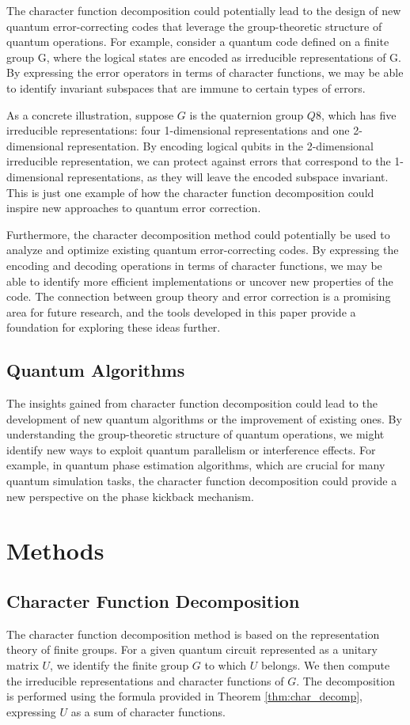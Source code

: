 \documentclass[11pt,a4paper]{article}
\begin{document}
The character function decomposition could potentially lead to the design of new quantum error-correcting codes that leverage the group-theoretic structure of quantum operations. For example, consider a quantum code defined on a finite group G, where the logical states are encoded as irreducible representations of G. By expressing the error operators in terms of character functions, we may be able to identify invariant subspaces that are immune to certain types of errors.

As a concrete illustration, suppose $G$ is the quaternion group $Q8$, which has five irreducible representations: four 1-dimensional representations and one 2-dimensional representation. By encoding logical qubits in the 2-dimensional irreducible representation, we can protect against errors that correspond to the 1-dimensional representations, as they will leave the encoded subspace invariant. This is just one example of how the character function decomposition could inspire new approaches to quantum error correction.

Furthermore, the character decomposition method could potentially be used to analyze and optimize existing quantum error-correcting codes. By expressing the encoding and decoding operations in terms of character functions, we may be able to identify more efficient implementations or uncover new properties of the code. The connection between group theory and error correction is a promising area for future research, and the tools developed in this paper provide a foundation for exploring these ideas further.

\subsection{Quantum Algorithms}
The insights gained from character function decomposition could lead to the development of new quantum algorithms or the improvement of existing ones. By understanding the group-theoretic structure of quantum operations, we might identify new ways to exploit quantum parallelism or interference effects. For example, in quantum phase estimation algorithms, which are crucial for many quantum simulation tasks\cite{Kitaev1995}, the character function decomposition could provide a new perspective on the phase kickback mechanism.
\section{Methods}
\subsection{Character Function Decomposition}
The character function decomposition method is based on the representation theory of finite groups. For a given quantum circuit represented as a unitary matrix $U$, we identify the finite group $G$ to which $U$ belongs. We then compute the irreducible representations and character functions of $G$. The decomposition is performed using the formula provided in Theorem \ref{thm:char_decomp}, expressing $U$ as a sum of character functions.
\end{document}
